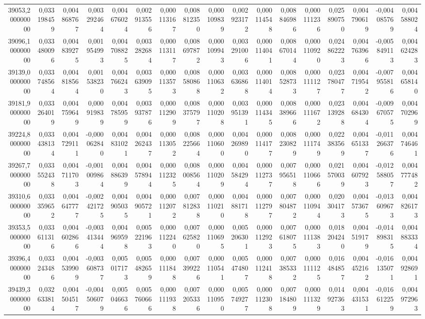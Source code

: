 \begin{longtable}{rrrrrrrrrrrrrrrrr}
39053,200000000 & 0,033198459 & 0,004868767 & 0,003292464 & 0,004676024 & 0,002913556 & 0,000113167 & 0,008812350 & 0,000109839 & 0,002923172 & 0,000114548 & 0,008846986 & 0,000111236 & 0,025890750 & 0,004790619 & -0,004085769 & 0,004588024\\
39096,100000000 & 0,033480096 & 0,004839275 & 0,001954993 & 0,004708825 & 0,003282684 & 0,000113117 & 0,008697872 & 0,000109943 & 0,003291006 & 0,000114041 & 0,008670144 & 0,000110920 & 0,024862223 & 0,004763966 & -0,005849113 & 0,004624283\\
39139,000000000 & 0,033748564 & 0,004818564 & 0,001538230 & 0,004766243 & 0,003639095 & 0,000113573 & 0,008580868 & 0,000110632 & 0,003636868 & 0,000114014 & 0,008528733 & 0,000111127 & 0,023780477 & 0,004719542 & -0,007955816 & 0,004658140\\
39181,900000000 & 0,033264019 & 0,004759649 & 0,000919839 & 0,004785959 & 0,003937876 & 0,000112909 & 0,008375797 & 0,000110208 & 0,003951391 & 0,000114345 & 0,008389666 & 0,000111672 & 0,023139288 & 0,004684304 & -0,009670575 & 0,004702969\\
39224,800000000 & 0,033438134 & 0,004729111 & -0,000062840 & 0,004831021 & 0,004262437 & 0,000113052 & 0,008225664 & 0,000110600 & 0,004269890 & 0,000114177 & 0,008230829 & 0,000111749 & 0,022383569 & 0,004651337 & -0,011266376 & 0,004746461\\
39267,700000000 & 0,033552438 & 0,004711703 & -0,001009864 & 0,004886399 & 0,004578944 & 0,000112325 & 0,008008564 & 0,000110209 & 0,004584294 & 0,000112737 & 0,007956518 & 0,000110666 & 0,021570039 & 0,004607923 & -0,012588057 & 0,004777482\\
39310,600000000 & 0,033359652 & 0,004647777 & -0,002421725 & 0,004905035 & 0,004905721 & 0,000112072 & 0,007812838 & 0,000110210 & 0,004881718 & 0,000112797 & 0,007804872 & 0,000110944 & 0,020304173 & 0,004573675 & -0,013609673 & 0,004826173\\
39353,500000000 & 0,033611316 & 0,004602866 & -0,003413444 & 0,004969598 & 0,005221963 & 0,000112240 & 0,007625820 & 0,000110695 & 0,005206301 & 0,000112923 & 0,007618075 & 0,000111383 & 0,018204240 & 0,004519179 & -0,014898315 & 0,004883334\\
39396,400000000 & 0,033243486 & 0,004539909 & -0,003608737 & 0,005017173 & 0,005482659 & 0,000111848 & 0,007399226 & 0,000110541 & 0,005474807 & 0,000112418 & 0,007385332 & 0,000111125 & 0,016484857 & 0,004452162 & -0,016135071 & 0,004928691\\
39439,300000000 & 0,032633814 & 0,004504517 & -0,004506079 & 0,005046636 & 0,005760666 & 0,000111938 & 0,007205336 & 0,000110950 & 0,005749277 & 0,000112308 & 0,007184809 & 0,000111329 & 0,014927363 & 0,004431531 & -0,016612259 & 0,004972963\\

\end{longtable}
